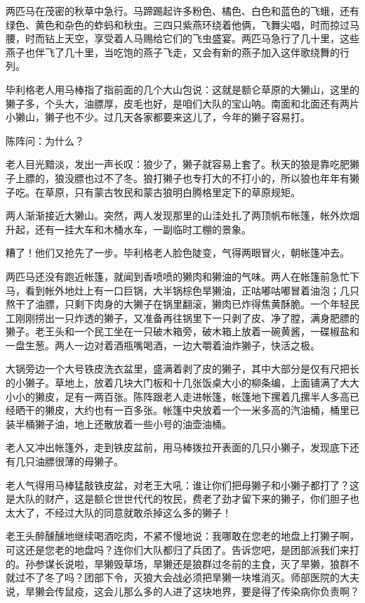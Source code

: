 \par 两匹马在茂密的秋草中急行。马蹄踢起许多粉色、橘色、白色和蓝色的飞蛾，还有绿色、黄色和杂色的蚱蚂和秋虫。三四只紫燕环绕着他俩，飞舞尖唱，时而掠过马腰，时而钻上天空，享受着人马赐给它们的飞虫盛宴。两匹马急行了几十里，这些燕子也伴飞了几十里，当吃饱的燕子飞走，又会有新的燕子加入这伴歌绕舞的行列。
\par 毕利格老人用马棒指了指前面的几个大山包说：这就是额仑草原的大獭山，这里的獭子多，个头大，油膘厚，皮毛也好，是咱们大队的宝山呐。南面和北面还有两片小獭山，獭子也不少。过几天各家都要来这儿了，今年的獭子容易打。
\par 陈阵问：为什么？
\par 老人目光黯淡，发出一声长叹：狼少了，獭子就容易上套了。秋天的狼是靠吃肥獭子上膘的，狼没膘也过不了冬。狼打獭子也专打大的不打小的，所以狼也年年有獭子吃。在草原，只有蒙古牧民和蒙古狼明白腾格里定下的草原规矩。
\par 
\par 两人渐渐接近大獭山。突然，两人发现那里的山洼处扎了两顶帆布帐篷，帐外炊烟升起，还有一挂大车和木桶水车，一副临时工棚的景象。
\par 糟了！他们又抢先了一步。毕利格老人脸色陡变，气得两眼冒火，朝帐篷冲去。
\par 两匹马还没有跑近帐篷，就闻到香喷喷的獭肉和獭油的气味。两人在帐篷前急忙下马，看到帐外地灶上有一口巨锅，大半锅棕色旱獭油，正咕嘟咕嘟冒着油泡；几只熬干了油膘，只剩下肉身的大獭子在锅里翻滚，獭肉已炸得焦黄酥脆。一个年轻民工刚刚捞出一只炸透的獭子，又准备再往锅里下一只剥了皮、净了膛，满身肥膘的獭子。老王头和一个民工坐在一只破木箱旁，破木箱上放着一碗黄酱，一碟椒盐和一盘生葱。两人一边对着酒瓶嘴喝酒，一边大嚼着油炸獭子，快活之极。
\par 大锅旁边一个大号铁皮洗衣盆里，盛满着剥了皮的獭子，其中大部分是仅有尺把长的小獭子。草地上，放着几块大门板和十几张饭桌大小的柳条编，上面铺满了大大小小的獭皮，足有一两百张。陈阵跟老人走进帐篷，帐篷地下摞着几摞半人多高已经晒干的獭皮，大约也有一百多张。帐篷中央放着一个一米多高的汽油桶，桶里已装半桶獭子油，地上还散放着一些小号的油壶油桶。
\par 老人又冲出帐篷外，走到铁皮盆前，用马棒拨拉开表面的几只小獭子，发现底下还有几只油膘很薄的母獭子。
\par 老人气得用马棒猛敲铁皮盆，对老王大吼：谁让你们把母獭子和小獭子都打了？这是大队的财产，这是额仑世世代代的牧民，费老了劲才留下来的獭子，你们胆子也太大了，不经过大队的同意就敢杀掉这么多的獭子！
\par 老王头醉醺醺地继续喝酒吃肉，不紧不慢地说：我哪敢在您老的地盘上打獭子啊，可这还是您老的地盘吗？连你们大队都归了兵团了。告诉您吧，是团部派我们来打的。孙参谋长说啦，旱獭毁草场，旱獭还是狼群过冬前的主食，灭了旱獭，狼群不就过不了冬了吗？团部下令，灭狼大会战必须把旱獭一块堆消灭。师部医院的大夫说，旱獭会传鼠疫，这会儿那么多的人进了这块地界，要是得了传染病你负责啊？
